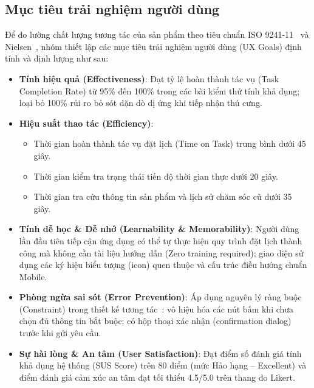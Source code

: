\subsection{Mục tiêu trải nghiệm người dùng}
Để đo lường chất lượng tương tác của sản phẩm theo tiêu chuẩn ISO 9241-11~\cite{ISO9241_11} và Nielsen~\cite{Nielsen1994}, nhóm thiết lập các mục tiêu trải nghiệm người dùng (UX Goals) định tính và định lượng như sau:
\begin{itemize}
    \item \textbf{Tính hiệu quả (Effectiveness)}: Đạt tỷ lệ hoàn thành tác vụ (Task Completion Rate) từ 95\% đến 100\% trong các bài kiểm thử tính khả dụng; loại bỏ 100\% rủi ro bỏ sót dặn dò dị ứng khi tiếp nhận thú cưng.
    \item \textbf{Hiệu suất thao tác (Efficiency)}:
    \begin{itemize}
        \item Thời gian hoàn thành tác vụ đặt lịch (Time on Task) trung bình dưới 45 giây.
        \item Thời gian kiểm tra trạng thái tiến độ thời gian thực dưới 20 giây.
        \item Thời gian tra cứu thông tin sản phẩm và lịch sử chăm sóc cũ dưới 35 giây.
    \end{itemize}
    \item \textbf{Tính dễ học \& Dễ nhớ (Learnability \& Memorability)}: Người dùng lần đầu tiên tiếp cận ứng dụng có thể tự thực hiện quy trình đặt lịch thành công mà không cần tài liệu hướng dẫn (Zero training required); giao diện sử dụng các ký hiệu biểu tượng (icon) quen thuộc và cấu trúc điều hướng chuẩn Mobile.
    \item \textbf{Phòng ngừa sai sót (Error Prevention)}: Áp dụng nguyên lý ràng buộc (Constraint) trong thiết kế tương tác~\cite{Norman2013}: vô hiệu hóa các nút bấm khi chưa chọn đủ thông tin bắt buộc; có hộp thoại xác nhận (confirmation dialog) trước khi gửi yêu cầu.
    \item \textbf{Sự hài lòng \& An tâm (User Satisfaction)}: Đạt điểm số đánh giá tính khả dụng hệ thống (SUS Score) trên 80 điểm (mức Hảo hạng -- Excellent) và điểm đánh giá cảm xúc an tâm đạt tối thiểu 4.5/5.0 trên thang đo Likert.
\end{itemize}


